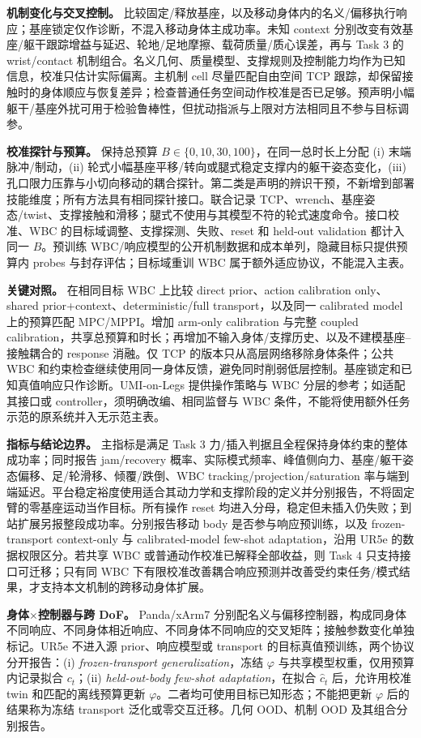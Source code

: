 \documentclass[11pt]{article}
\begin{document}
\textbf{机制变化与交叉控制。} 比较固定/释放基座，以及移动身体内的名义/偏移执行响应；基座锁定仅作诊断，不混入移动身体主成功率。未知 context 分别改变有效基座/躯干跟踪增益与延迟、轮地/足地摩擦、载荷质量/质心误差，再与 Task 3 的 wrist/contact 机制组合。名义几何、质量模型、支撑规则及控制能力均作为已知信息，校准只估计实际偏离。主机制 cell 尽量匹配自由空间 TCP 跟踪，却保留接触时的身体顺应与恢复差异；检查普通任务空间动作校准是否已足够。预声明小幅躯干/基座外扰可用于检验鲁棒性，但扰动指派与上限对方法相同且不参与目标调参。

\textbf{校准探针与预算。} 保持总预算 $B\in\{0,10,30,100\}$，在同一总时长上分配 (i) 末端脉冲/制动，(ii) 轮式小幅基座平移/转向或腿式稳定支撑内的躯干姿态变化，(iii) 孔口限力压靠与小切向移动的耦合探针。第二类是声明的辨识干预，不新增到部署技能维度；所有方法具有相同探针接口。联合记录 TCP、wrench、基座姿态/twist、支撑接触和滑移；腿式不使用与其模型不符的轮式速度命令。接口校准、WBC 的目标域调整、支撑探测、失败、reset 和 held-out validation 都计入同一 $B$。预训练 WBC/响应模型的公开机制数据和成本单列，隐藏目标只提供预算内 probes 与封存评估；目标域重训 WBC 属于额外适应协议，不能混入主表。

\textbf{关键对照。} 在相同目标 WBC 上比较 direct prior、action calibration only、shared prior+context、deterministic/full transport，以及同一 calibrated model 上的预算匹配 MPC/MPPI。增加 arm-only calibration 与完整 coupled calibration，共享总预算和时长；再增加不输入身体/支撑历史、以及不建模基座--接触耦合的 response 消融。仅 TCP 的版本只从高层网络移除身体条件；公共 WBC 和约束检查继续使用同一身体反馈，避免同时削弱低层控制。基座锁定和已知真值响应只作诊断。UMI-on-Legs 提供操作策略与 WBC 分层的参考\cite{umilegs}；如适配其接口或 controller，须明确改编、相同监督与 WBC 条件，不能将使用额外任务示范的原系统并入无示范主表。

\textbf{指标与结论边界。} 主指标是满足 Task 3 力/插入判据且全程保持身体约束的整体成功率；同时报告 jam/recovery 概率、实际模式频率、峰值侧向力、基座/躯干姿态偏移、足/轮滑移、倾覆/跌倒、WBC tracking/projection/saturation 率与端到端延迟。平台稳定裕度使用适合其动力学和支撑阶段的定义并分别报告，不将固定臂的零基座运动当作目标。所有操作 reset 均进入分母，稳定但未插入仍失败；到站扩展另报整段成功率。分别报告移动 body 是否参与响应预训练，以及 frozen-transport context-only 与 calibrated-model few-shot adaptation，沿用 UR5e 的数据权限区分。若共享 WBC 或普通动作校准已解释全部收益，则 Task 4 只支持接口可迁移；只有同 WBC 下有限校准改善耦合响应预测并改善受约束任务/模式结果，才支持本文机制的跨移动身体扩展。

\textbf{身体$\times$控制器与跨 DoF。} Panda/xArm7 分别配名义与偏移控制器，构成同身体不同响应、不同身体相近响应、不同身体不同响应的交叉矩阵；接触参数变化单独标记。UR5e 不进入源 prior、响应模型或 transport 的目标真值预训练，两个协议分开报告：(i) \emph{frozen-transport generalization}，冻结 $\varphi$ 与共享模型权重，仅用预算内记录拟合 $c_t$；(ii) \emph{held-out-body few-shot adaptation}，在拟合 $\hat c_t$ 后，允许用校准 twin 和匹配的离线预算更新 $\varphi$。二者均可使用目标已知形态；不能把更新 $\varphi$ 后的结果称为冻结 transport 泛化或零交互迁移。几何 OOD、机制 OOD 及其组合分别报告。
\end{document}
